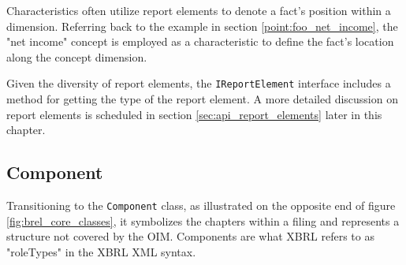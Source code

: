Characteristics often utilize report elements to denote a fact's position within a dimension.
Referring back to the example in section \ref{point:foo_net_income}, the "net income" concept is employed as a characteristic to define the fact's location along the concept dimension.


Given the diversity of report elements, the \texttt{IReportElement} interface includes a method for getting the type of the report element.
A more detailed discussion on report elements is scheduled in section \ref{sec:api_report_elements} later in this chapter.

\subsection{Component}


Transitioning to the \texttt{Component} class, as illustrated on the opposite end of figure \ref{fig:brel_core_classes}, 
it symbolizes the chapters within a filing and represents a structure not covered by the OIM.
Components are what XBRL refers to as "roleTypes" in the XBRL XML syntax.

